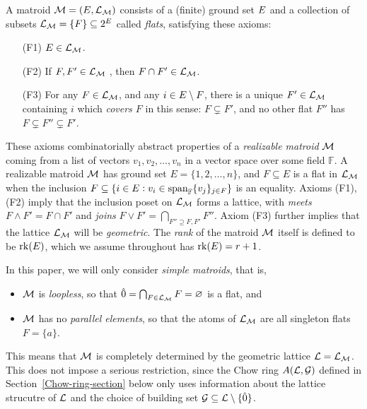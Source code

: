 \begin{defn} \label{flats} \rm
A matroid $\mathcal{M} = (E, \mathcal{L}_{\mathcal{M}})$ consists of a (finite) ground set $E$ and a collection of subsets $\mathcal{L}_{\mathcal{M}} =\{F\} \subseteq 2^E$ called {\it flats},
satisfying these axioms:
\begin{enumerate}
    \item[(F1)] $E\in \mathcal{L}_{\mathcal{M}}$. %
    \item[(F2)] If $F, F'\in \mathcal{L}_{\mathcal{M}}$ , then $F \cap F' \in \mathcal{L}_{\mathcal{M}}$. %
    \item[(F3)] For any $F\in \mathcal{L}_{\mathcal{M}}$, and any $i \in E\setminus F$, there is a unique $F' \in \mathcal{L}_{\mathcal{M}}$ containing $i$ which {\it covers $F$} in this sense: 
    $F \subsetneq F'$, and no other flat $F''$ has $F \subsetneq F'' \subsetneq F'$. 
\end{enumerate} 
\end{defn}
These axioms combinatorially abstract properties of a {\it realizable matroid} $\mathcal{M}$ coming from a list of vectors $v_1,v_2,\ldots,v_n$
in a vector space over some field $\mathbb{F}$.  
A realizable matroid $\mathcal{M}$ has ground set $E=\{1,2,\ldots,n\}$, and $F \subseteq E$ is a flat in $\mathcal{L}_{\mathcal{M}}$ when 
the inclusion $F \subseteq 
 \{i \in E: v_i \in \mathrm{span}_{\mathbb{F}}\{ v_j\}_{j \in F} 
 \}$ is an equality. 
Axioms (F1),(F2) imply that the inclusion poset 
on $\mathcal{L}_{\mathcal{M}}$ forms a lattice, with {\it meets} $F \wedge F'=F \cap F'$ and {\it joins}
$F \vee F'=\bigcap_{F'' \supseteq F,F'} F''$.
Axiom (F3) further implies that the lattice $\mathcal{L}_{\mathcal{M}}$ will be {\it geometric}.
The {\it rank} of the matroid $\mathcal{M}$ itself is defined to be $\operatorname{\mathrm{rk}}(E)$, which we assume throughout has $\operatorname{\mathrm{rk}}(E)=r+1$. 

\begin{remark}
In this paper, we will only consider {\it simple matroids}, that is, 
\begin{itemize}
    \item $\mathcal{M}$ is {\it loopless}, so that $\hat{0}=\bigcap_{F \in \mathcal{L}_{\mathcal{M}}} F =\varnothing$ is a flat, and 
    \item $\mathcal{M}$ has no {\it parallel elements}, so that the atoms of $\mathcal{L}_{\mathcal{M}}$ are all singleton flats $F=\{a\}$.
\end{itemize}
This means that $\mathcal{M}$ is completely determined by
the geometric lattice $\mathcal{L}=\mathcal{L}_{\mathcal{M}}$.  This does not
impose a serious restriction, since the Chow ring $A(\mathcal{L},\mathcal{G})$ defined in Section~\ref{Chow-ring-section} below only uses information about the lattice strucutre of 
$\mathcal{L}$ and the choice of
building set $\mathcal{G} \subseteq \mathcal{L} \setminus \{\hat{0}\}$.  
\end{remark}

